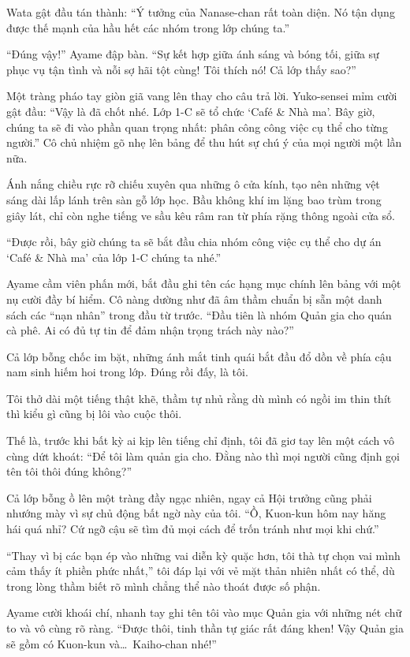\documentclass[../main.tex]{subfiles}
\begin{document}
Wata gật đầu tán thành: ``Ý tưởng của Nanase-chan rất toàn diện. Nó tận dụng được thế mạnh của hầu hết các nhóm trong lớp chúng ta.''

``Đúng vậy!'' Ayame đập bàn. ``Sự kết hợp giữa ánh sáng và bóng tối, giữa sự phục vụ tận tình và nỗi sợ hãi tột cùng! Tôi thích nó! Cả lớp thấy sao?''

Một tràng pháo tay giòn giã vang lên thay cho câu trả lời. Yuko-sensei mỉm cười gật đầu: ``Vậy là đã chốt nhé. Lớp 1-C sẽ tổ chức `Café \& Nhà ma'. Bây giờ, chúng ta sẽ đi vào phần quan trọng nhất: phân công công việc cụ thể cho từng người.'' Cô chủ nhiệm gõ nhẹ lên bảng để thu hút sự chú ý của mọi người một lần nữa.

Ánh nắng chiều rực rỡ chiếu xuyên qua những ô cửa kính, tạo nên những vệt sáng dài lấp lánh trên sàn gỗ lớp học. Bầu không khí im lặng bao trùm trong giây lát, chỉ còn nghe tiếng ve sầu kêu râm ran từ phía rặng thông ngoài cửa sổ.

``Được rồi, bây giờ chúng ta sẽ bắt đầu chia nhóm công việc cụ thể cho dự án `Café \& Nhà ma' của lớp 1-C chúng ta nhé.''

Ayame cầm viên phấn mới, bắt đầu ghi tên các hạng mục chính lên bảng với một nụ cười đầy bí hiểm. Cô nàng dường như đã âm thầm chuẩn bị sẵn một danh sách các ``nạn nhân'' trong đầu từ trước. ``Đầu tiên là nhóm Quản gia cho quán cà phê. Ai có đủ tự tin để đảm nhận trọng trách này nào?''

Cả lớp bỗng chốc im bặt, những ánh mắt tinh quái bắt đầu đổ dồn về phía cậu nam sinh hiếm hoi trong lớp. Đúng rồi đấy, là tôi.

Tôi thở dài một tiếng thật khẽ, thầm tự nhủ rằng dù mình có ngồi im thin thít thì kiểu gì cũng bị lôi vào cuộc thôi.

Thế là, trước khi bất kỳ ai kịp lên tiếng chỉ định, tôi đã giơ tay lên một cách vô cùng dứt khoát: ``Để tôi làm quản gia cho. Đằng nào thì mọi người cũng định gọi tên tôi thôi đúng không?''

Cả lớp bỗng ồ lên một tràng đầy ngạc nhiên, ngay cả Hội trưởng cũng phải nhướng mày vì sự chủ động bất ngờ này của tôi. ``Ồ, Kuon-kun hôm nay hăng hái quá nhỉ? Cứ ngỡ cậu sẽ tìm đủ mọi cách để trốn tránh như mọi khi chứ.''

``Thay vì bị các bạn ép vào những vai diễn kỳ quặc hơn, tôi thà tự chọn vai mình cảm thấy ít phiền phức nhất,'' tôi đáp lại với vẻ mặt thản nhiên nhất có thể, dù trong lòng thầm biết rõ mình chẳng thể nào thoát được số phận.

Ayame cười khoái chí, nhanh tay ghi tên tôi vào mục Quản gia với những nét chữ to và vô cùng rõ ràng. ``Được thôi, tinh thần tự giác rất đáng khen! Vậy Quản gia sẽ gồm có Kuon-kun và\dots\ Kaiho-chan nhé!''
\end{document}
